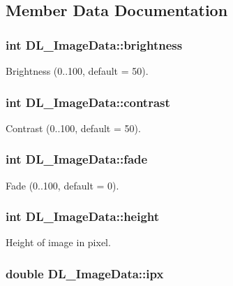 \subsection{Member Data Documentation}
\hypertarget{structDL__ImageData_a431b0e517350cc8bfbc5a293f1b61481}{
\subsubsection[{brightness}]{\setlength{\rightskip}{0pt plus 5cm}int D\-L\-\_\-\-Image\-Data\-::brightness}}\label{structDL__ImageData_a431b0e517350cc8bfbc5a293f1b61481}
Brightness (0..100, default = 50). \hypertarget{structDL__ImageData_aaa222cf2a68d3d52c424fe02a8c93475}{
\subsubsection[{contrast}]{\setlength{\rightskip}{0pt plus 5cm}int D\-L\-\_\-\-Image\-Data\-::contrast}}\label{structDL__ImageData_aaa222cf2a68d3d52c424fe02a8c93475}
Contrast (0..100, default = 50). \hypertarget{structDL__ImageData_a1126098cf0a76bbc4a65b7bfa312356b}{
\subsubsection[{fade}]{\setlength{\rightskip}{0pt plus 5cm}int D\-L\-\_\-\-Image\-Data\-::fade}}\label{structDL__ImageData_a1126098cf0a76bbc4a65b7bfa312356b}
Fade (0..100, default = 0). \hypertarget{structDL__ImageData_a43db5e2bdc1c7dca3ee32fdc8400613d}{
\subsubsection[{height}]{\setlength{\rightskip}{0pt plus 5cm}int D\-L\-\_\-\-Image\-Data\-::height}}\label{structDL__ImageData_a43db5e2bdc1c7dca3ee32fdc8400613d}
Height of image in pixel. \hypertarget{structDL__ImageData_a84d5e166e086f6f7f99aa912f64ef902}{
\subsubsection[{ipx}]{\setlength{\rightskip}{0pt plus 5cm}double D\-L\-\_\-\-Image\-Data\-::ipx}}\label{structDL__ImageData_a84d5e166e086f6f7f99aa912f64ef902}
